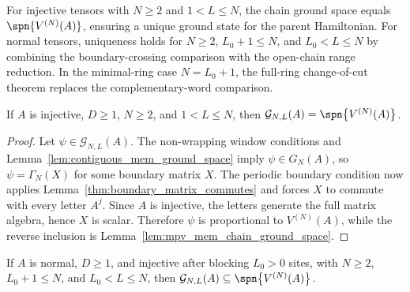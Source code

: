For injective tensors with $N\ge2$ and $1<L\le N$, the chain ground space equals
$\spn\{V^{(N)}(A)\}$, ensuring a unique ground state for the parent
Hamiltonian. For normal tensors, uniqueness holds for $N\ge2$, $L_0+1\le N$, and
$L_0<L\le N$ by combining the boundary-crossing comparison with the open-chain
range reduction. In the minimal-ring case $N=L_0+1$, the full-ring change-of-cut
theorem replaces the complementary-word comparison.

\begin{lemma}%
    \label{thm:chain_ground_space_eq_mpv_blk}
    \leanok
    If $A$ is injective, $D \ge 1$, $N \ge 2$, and $1 < L \le N$, then
    $\mathcal G_{N,L}(A) = \spn\bigl\{V^{(N)}(A)\bigr\}$.
\end{lemma}

\begin{proof}
    \leanok
    Let $\psi \in \mathcal G_{N,L}(A)$. The non-wrapping window conditions and
    Lemma~\ref{lem:contiguous_mem_ground_space} imply $\psi \in G_{N}(A)$, so
    $\psi = \Gamma_{N}(X)$ for some boundary matrix $X$. The periodic boundary
    condition now applies Lemma~\ref{thm:boundary_matrix_commutes} and forces
    $X$ to commute with every letter $A^{j}$. Since $A$ is injective, the
    letters generate the full matrix algebra, hence $X$ is scalar. Therefore
    $\psi$ is proportional to $V^{(N)}(A)$, while the reverse inclusion is
    Lemma~\ref{lem:mpv_mem_chain_ground_space}.
\end{proof}

\begin{lemma}
    \label{thm:normal_range_reduction_containment}
    \leanok
    If $A$ is normal, $D \ge 1$, and injective after blocking $L_0>0$ sites,
    with $N \ge 2$, $L_0+1\le N$, and $L_0 < L \le N$, then
    $\mathcal G_{N,L}(A) \subseteq \spn\bigl\{V^{(N)}(A)\bigr\}$.
\end{lemma}

